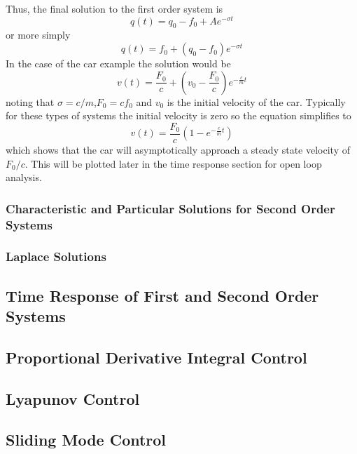 Thus, the final solution to the first order system is 
\begin{equation}
    q(t) = q_0 - f_0 + Ae^{-\sigma t}
\end{equation}
or more simply
\begin{equation}
    q(t) = f_0 + (q_0 - f_0)e^{-\sigma t}
\end{equation}
In the case of the car example the solution would be
\begin{equation}
    v(t) = \frac{F_0}{c} + \left(v_0 - \frac{F_0}{c}\right)e^{-\frac{c}{m}t}
\end{equation}
noting that $\sigma = c/m$,$F_0 = cf_0$ and $v_0$ is the initial velocity of the car. Typically for these types of systems the initial velocity is zero so the equation simplifies to
\begin{equation}
    v(t) = \frac{F_0}{c}\left(1 - e^{-\frac{c}{m}t}\right)
\end{equation}
which shows that the car will asymptotically approach a steady state velocity of $F_0/c$. This will be plotted later in the time response section for open loop analysis.

\subsubsection{Characteristic and Particular Solutions for Second Order Systems}

\subsubsection{Laplace Solutions}

\subsection{Time Response of First and Second Order Systems}

\subsection{Proportional Derivative Integral Control}

\subsection{Lyapunov Control}

\subsection{Sliding Mode Control}

